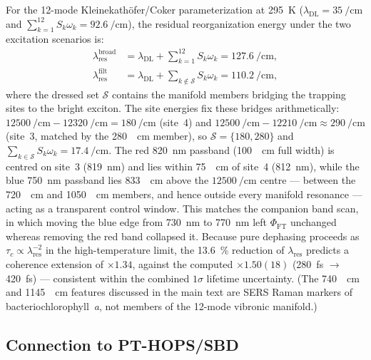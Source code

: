 \documentclass[11pt,a4paper]{article}
\begin{document}
For the 12-mode Kleinekath\"{o}fer/Coker parameterization at \qty{295}{\kelvin} ($\lambda_{\mathrm{DL}} = \qty{35}{\per\cm}$ and $\sum_{k=1}^{12} S_k \omega_k = \qty{92.6}{\per\cm}$), the residual reorganization energy under the two excitation scenarios is:
\begin{align}
\lambda_{\mathrm{res}}^{\mathrm{broad}} &= \lambda_{\mathrm{DL}} + \sum_{k=1}^{12} S_k \omega_k = \qty{127.6}{\per\cm}, \label{eq:SI_lambda_broad} \\
\lambda_{\mathrm{res}}^{\mathrm{filt}} &= \lambda_{\mathrm{DL}} + \sum_{k \notin \mathcal{S}} S_k \omega_k = \qty{110.2}{\per\cm}, \label{eq:SI_lambda_filt}
\end{align}
where the dressed set $\mathcal{S}$ contains the manifold members bridging the trapping sites to the bright exciton. The site energies fix these bridges arithmetically: $\qty{12500}{\per\cm} - \qty{12320}{\per\cm} = \qty{180}{\per\cm}$ (site~4) and $\qty{12500}{\per\cm} - \qty{12210}{\per\cm} \approx \qty{290}{\per\cm}$ (site~3, matched by the \qty{280}{\per\cm} member), so $\mathcal{S} = \{180, 280\}$ and $\sum_{k \in \mathcal{S}} S_k \omega_k = \qty{17.4}{\per\cm}$. The red \qty{820}{\nm} passband (\qty{100}{\per\cm} full width) is centred on site~3 (\qty{819}{\nm}) and lies within \qty{75}{\per\cm} of site~4 (\qty{812}{\nm}), while the blue \qty{750}{\nm} passband lies \qty{833}{\per\cm} above the $\qty{12500}{\per\cm}$ centre --- between the \qty{720}{\per\cm} and \qty{1050}{\per\cm} members, and hence outside every manifold resonance --- acting as a transparent control window. This matches the companion band scan, in which moving the blue edge from \qty{730}{\nm} to \qty{770}{\nm} left $\Phi_{\mathrm{FT}}$ unchanged whereas removing the red band collapsed it.
Because pure dephasing proceeds as $\tau_c \propto \lambda_{\mathrm{res}}^{-2}$ in the high-temperature limit, the \qty{13.6}{\percent} reduction of $\lambda_{\mathrm{res}}$ predicts a coherence extension of $\times 1.34$, against the computed $\times 1.50(18)$ (\qty{280}{\fs} $\to$ \qty{420}{\fs}) --- consistent within the combined $1\sigma$ lifetime uncertainty. (The \qty{740}{\per\cm} and \qty{1145}{\per\cm} features discussed in the main text are SERS Raman markers of bacteriochlorophyll~\textit{a}, not members of the 12-mode vibronic manifold.)

\subsection{Connection to PT-HOPS/SBD}
\end{document}
